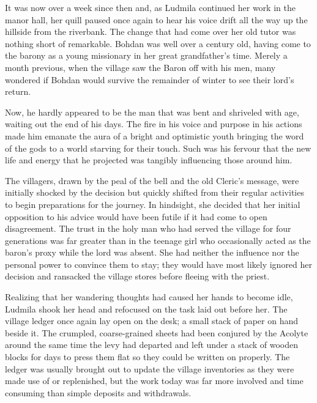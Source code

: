  

It was now over a week since then and, as Ludmila continued her work in the manor hall, her quill paused once again to hear his voice drift all the way up the hillside from the riverbank. The change that had come over her old tutor was nothing short of remarkable. Bohdan was well over a century old, having come to the barony as a young missionary in her great grandfather’s time. Merely a month previous, when the village saw the Baron off with his men, many wondered if Bohdan would survive the remainder of winter to see their lord’s return.

 

Now, he hardly appeared to be the man that was bent and shriveled with age, waiting out the end of his days. The fire in his voice and purpose in his actions made him emanate the aura of a bright and optimistic youth bringing the word of the gods to a world starving for their touch. Such was his fervour that the new life and energy that he projected was tangibly influencing those around him.

 

The villagers, drawn by the peal of the bell and the old Cleric’s message, were initially shocked by the decision but quickly shifted from their regular activities to begin preparations for the journey. In hindsight, she decided that her initial opposition to his advice would have been futile if it had come to open disagreement. The trust in the holy man who had served the village for four generations was far greater than in the teenage girl who occasionally acted as the baron’s proxy while the lord was absent. She had neither the influence nor the personal power to convince them to stay; they would have most likely ignored her decision and ransacked the village stores before fleeing with the priest.

 

Realizing that her wandering thoughts had caused her hands to become idle, Ludmila shook her head and refocused on the task laid out before her. The village ledger once again lay open on the desk; a small stack of paper on hand beside it. The crumpled, coarse-grained sheets had been conjured by the Acolyte around the same time the levy had departed and left under a stack of wooden blocks for days to press them flat so they could be written on properly. The ledger was usually brought out to update the village inventories as they were made use of or replenished, but the work today was far more involved and time consuming than simple deposits and withdrawals.

